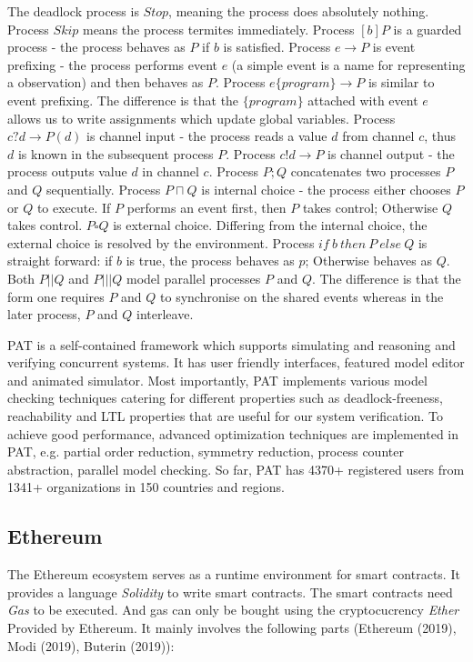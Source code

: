 \documentclass{KERauth}
\begin{document}
The deadlock process is $Stop$, meaning the process does absolutely nothing. Process $Skip$ means the process termites immediately. Process $[b]P$ is a guarded process - the process behaves as $P$ if $b$ is satisfied. Process $e \rightarrow  P$ is event prefixing - the process performs event $e$ (a simple event is a name for representing a observation) and then behaves as $P$. Process $e \{program\} \rightarrow P$ is similar to event prefixing. The difference is that the $\{program\}$ attached with event $e$ allows us to write assignments which update global variables. Process $c?d \rightarrow P(d)$ is channel input - the process reads a value $d$ from channel $c$, thus $d$ is known in the subsequent process $P$. Process $c!d \rightarrow P$ is channel output - the process outputs value $d$ in channel $c$. Process $P; Q$ concatenates two processes $P$ and $Q$ sequentially. Process $P \sqcap Q$ is internal choice - the process either chooses $P$ or $Q$ to execute. If $P$ performs an event first, then $P$ takes control; Otherwise $Q$ takes control. $P \square Q$ is external choice. Differing from the internal choice, the external choice is resolved by the environment. Process $if\ b\ then\ P\ else\ Q$ is straight forward: if $b$ is true, the process behaves as $p$; Otherwise behaves as $Q$. Both $P || Q $ and $P ||| Q$ model parallel processes $P$ and $Q$. The difference is that the form one requires $P$ and $Q$ to synchronise on the shared events whereas in the later process, $P$ and $Q$ interleave.

PAT is a self-contained framework which supports simulating and reasoning and verifying concurrent systems. It has user friendly interfaces, featured model editor and animated simulator. Most importantly, PAT implements various model checking techniques catering for different properties such as deadlock-freeness, reachability and LTL properties that are useful for our system verification. To achieve good performance, advanced optimization techniques are implemented in PAT, e.g. partial order reduction, symmetry reduction, process counter abstraction, parallel model checking. So far, PAT has 4370+ registered users from 1341+ organizations in 150 countries and regions.

\subsection{Ethereum}

The Ethereum ecosystem serves as a runtime environment for smart contracts. It provides a language \emph{Solidity} to write smart contracts. The smart contracts need \emph{Gas} to be executed. And gas can only be bought using the cryptocucrency \emph{Ether} Provided by Ethereum. It mainly involves the following parts (Ethereum (2019), Modi (2019), Buterin (2019)):
\end{document}
